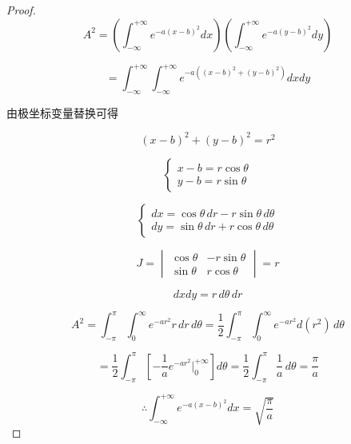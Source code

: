 \documentclass[12pt,a4paper]{article}
\numberwithin{subsection}{section}   %
\numberwithin{subsubsection}{subsection}
\theoremstyle{plain}
\theoremstyle{definition}
\theoremstyle{remark}
\theoremstyle{remark}
\begin{document}
	
	\begin{proof}
		\begin{equation*}
			A^2 = \left( \int_{-\infty}^{+\infty} e^{-a(x-b)^2} dx \right) \left( \int_{-\infty}^{+\infty} e^{-a(y-b)^2} dy \right)
		\end{equation*}
		
		\begin{equation*}
			= \int_{-\infty}^{+\infty} \int_{-\infty}^{+\infty} e^{-a((x-b)^2 + (y-b)^2)} dx dy
		\end{equation*}
		
		由极坐标变量替换可得
		
		\begin{equation*}
			(x - b)^2 + (y - b)^2 = r^2
		\end{equation*}
		
		\begin{equation*}
			\begin{cases}
				x - b = r \cos\theta \\
				y - b = r \sin\theta
			\end{cases}
		\end{equation*}
		
		\begin{equation*}
			\begin{cases}
				dx = \cos\theta \, dr - r \sin\theta \, d\theta \\
				dy = \sin\theta \, dr + r \cos\theta \, d\theta
			\end{cases}
		\end{equation*}
		
		\begin{equation*}
			J = \begin{vmatrix}
				\cos\theta & -r \sin\theta \\
				\sin\theta & r \cos\theta
			\end{vmatrix} = r
		\end{equation*}
		
		\begin{equation*}
			dx dy = r \, d\theta \, dr
		\end{equation*}
		
		\begin{equation*}
			A^2 = \int_{-\pi}^{\pi} \int_{0}^{\infty} e^{-ar^2} r \, dr \, d\theta	= \frac{1}{2} \int_{-\pi}^{\pi} \int_{0}^{\infty} e^{-ar^2} d(r^2) \, d\theta
		\end{equation*}
		
		
		\begin{equation*}
			= \frac{1}{2} \int_{-\pi}^{\pi} \left[ -\frac{1}{a} e^{-ar^2} \Big|_{0}^{+\infty} \right] d\theta= \frac{1}{2} \int_{-\pi}^{\pi} \frac{1}{a} \, d\theta	= \frac{\pi}{a}
		\end{equation*}
		
		
		\begin{equation*}
			\therefore	\int_{-\infty}^{+\infty} e^{-a(x-b)^2} dx = \sqrt{\frac{\pi}{a}}
		\end{equation*}
		
	\end{proof}
	
\end{document}
